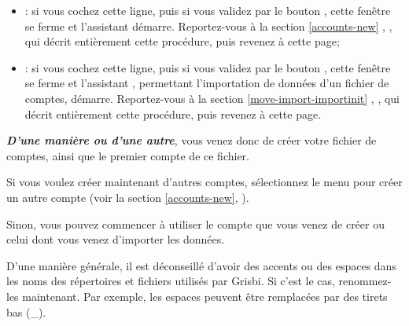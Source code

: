 \begin{enumerate}
		\begin{itemize}
			\item[\textopenbullet] : si vous cochez cette ligne, puis si vous validez par le bouton , cette fenêtre se ferme et l'assistant  démarre. Reportez-vous à la section \vref{accounts-new}%
			, , qui décrit entièrement cette procédure, puis revenez à cette page;

			\item[\textopenbullet] : si vous cochez cette ligne, puis si vous validez par le bouton , cette fenêtre se ferme et l'assistant , permettant l'importation de données d'un fichier de comptes, démarre. Reportez-vous à la section \vref{move-import-importinit}%
			, , qui décrit entièrement cette procédure, puis revenez à cette page.
		\end{itemize}
\end{enumerate}

\label{start-newfile-end}

\textit{\textbf{D'une manière ou d'une autre}}, vous venez donc de créer votre fichier de comptes, ainsi que le premier compte de ce fichier. 

Si vous voulez créer maintenant d'autres comptes, sélectionnez le menu  pour créer un autre compte (voir la section \vref{accounts-new}, ).

Sinon, vous pouvez commencer à utiliser le compte que vous venez de créer ou celui dont vous venez d'importer les données.

D'une manière générale, il est déconseillé d'avoir des accents ou des espaces dans les noms des répertoires et fichiers utilisés par Grisbi. Si c'est le cas, renommez-les maintenant. Par exemple, les espaces peuvent être remplacées par des tirets bas (\_).



